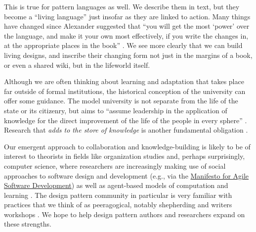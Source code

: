 \begin{refsection}
This is true for pattern languages as well.  We describe them in text, but they become a ``living language'' \cite[p.~xvii]{alexander1977pattern}  just insofar as they are linked to action.  Many things have changed since Alexander suggested that ``you will get the most `power' over the language, and make it your own most effectively, if you write the changes in, at the appropriate places in the book'' \cite[p.~xl]{alexander1977pattern}.  We see more clearly that we can build living designs, and inscribe their changing form not just in the margins of a book, or even a shared wiki, but in the lifeworld itself.  

Although we are often thinking about learning and adaptation that takes
place far outside of formal institutions, the historical conception
of the university can offer some guidance.
%
The model university is not separate from the life of the state or its
citizenry, but aims to ``assume leadership in the application of
knowledge for the direct improvement of the life of the people in
every sphere'' \cite[p.~88]{curti1949university}. Research that \emph{adds
to the store of knowledge} is another fundamental
obligation \cite[p.~550]{curti1949university}.    


Our emergent approach to collaboration and knowledge-building is likely to be of interest to theorists in fields like organization studies and, perhaps surprisingly, computer science, where researchers are increasingly making use of social approaches to software design and development (e.g., via the \href{http://www.agilemanifesto.org/}{Manifesto for Agile Software Development}) as well as agent-based models of computation and learning \cite{minsky1967programming,poetry-workshop}.  
%
The design pattern community in particular is very familiar with practices that we think of as peeragogical, notably shepherding and writers workshops \cite{harrison1999language,coplien1997pattern}.  We hope to help design pattern authors and researchers expand on these strengths.


\end{refsection}
